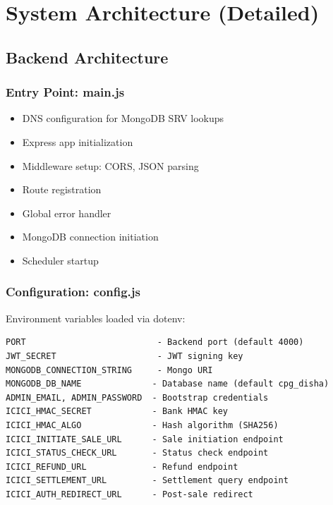 \documentclass[12pt,a4paper]{article}
\begin{document}
\section{System Architecture (Detailed)}

\subsection{Backend Architecture}

\subsubsection{Entry Point: main.js}
\begin{itemize}
  \item DNS configuration for MongoDB SRV lookups
  \item Express app initialization
  \item Middleware setup: CORS, JSON parsing
  \item Route registration
  \item Global error handler
  \item MongoDB connection initiation
  \item Scheduler startup
\end{itemize}

\subsubsection{Configuration: config.js}
Environment variables loaded via dotenv:
\begin{lstlisting}
PORT                          - Backend port (default 4000)
JWT_SECRET                    - JWT signing key
MONGODB_CONNECTION_STRING     - Mongo URI
MONGODB_DB_NAME              - Database name (default cpg_disha)
ADMIN_EMAIL, ADMIN_PASSWORD  - Bootstrap credentials
ICICI_HMAC_SECRET            - Bank HMAC key
ICICI_HMAC_ALGO              - Hash algorithm (SHA256)
ICICI_INITIATE_SALE_URL      - Sale initiation endpoint
ICICI_STATUS_CHECK_URL       - Status check endpoint
ICICI_REFUND_URL             - Refund endpoint
ICICI_SETTLEMENT_URL         - Settlement query endpoint
ICICI_AUTH_REDIRECT_URL      - Post-sale redirect
\end{lstlisting}
\end{document}
